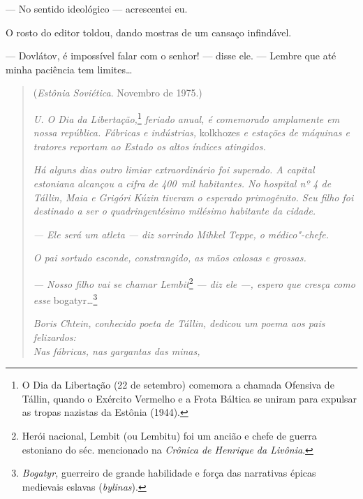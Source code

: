 --- No sentido ideológico --- acrescentei eu.

O rosto do editor toldou, dando mostras de um cansaço infindável.

--- Dovlátov, é impossível falar com o senhor! --- disse ele. --- Lembre
que até minha paciência tem limites\ldots{}


\movetooddpage
\begin{center}
{}
\end{center}

\begin{quotation}
\begin{flushright}
(\emph{Estônia Soviética}. Novembro de 1975.)
\end{flushright}
\vspace{4pt}
\noindent\emph{U. O Dia da Libertação,}\footnote{O Dia da
  Libertação (22 de setembro) comemora a chamada Ofensiva de Tállin,
  quando o Exército Vermelho e a Frota Báltica se uniram para expulsar
  as tropas nazistas da Estônia (1944).} \emph{feriado anual, é
comemorado amplamente em nossa república. Fábricas e indústrias,}
kolkhozes \emph{e estações de máquinas e tratores reportam ao Estado os %
altos índices atingidos.}

\emph{Há alguns dias outro limiar extraordinário foi superado. A capital
estoniana alcançou a cifra de 400~mil habitantes. No hospital nº 4 de
Tállin, Maia e Grigóri Kúzin tiveram o esperado primogênito. Seu filho
foi destinado a ser o quadringentésimo milésimo habitante da cidade.}

\emph{--- Ele será um atleta --- diz sorrindo Mihkel Teppe, o
médico"-chefe.}

\emph{O pai sortudo esconde, constrangido, as mãos calosas e grossas.}

\emph{--- Nosso filho vai se chamar Lembit}\footnote{Herói nacional,
  Lembit (ou Lembitu) foi um ancião e chefe de guerra estoniano do séc.
   mencionado na \emph{Crônica de Henrique da Livônia}.} \emph{--- diz ele
---, espero que cresça como esse} bogatyr\emph{\ldots{}}\footnote{\emph{Bogatyr,}
  guerreiro de grande habilidade e força das narrativas épicas medievais
  eslavas (\emph{bylinas}).}

\emph{Boris Chtein, conhecido poeta de Tállin, dedicou um poema aos pais
felizardos:}\\

\emph{Nas fábricas, nas gargantas das minas,}


\end{quotation}
